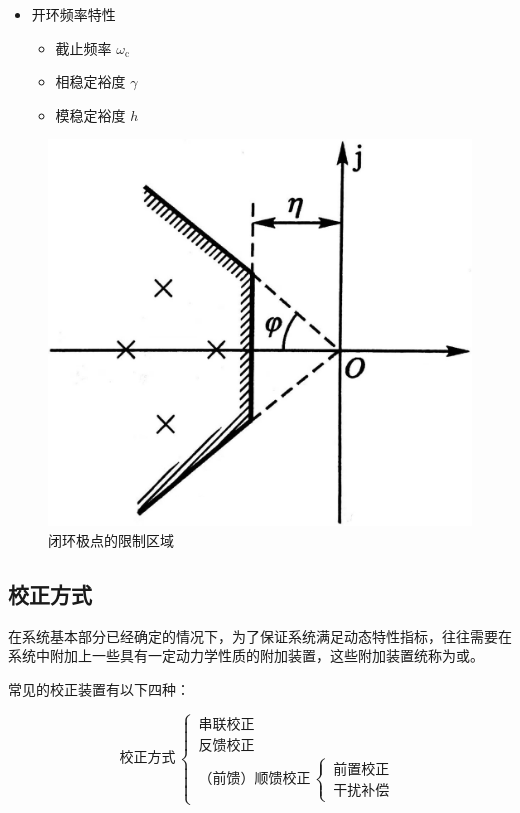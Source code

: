 \begin{enumerate}[1. ]
\begin{minipage}{0.7\linewidth}
\begin{itemize}
		\item 开环频率特性
		\begin{itemize}
			\item 截止频率 \quad $\omega_{\text{c}}$
			\item 相稳定裕度 \quad $\gamma$
			\item 模稳定裕度 \quad $h$
		\end{itemize}
	\end{itemize}
	\end{minipage}
\end{enumerate}
	
\begin{figure}[!htb]
	\centering
	\includegraphics[width=0.3\linewidth]{pic/复数域性能指标.jpeg}
	\vspace*{-1em}
	\caption{闭环极点的限制区域}
	\label{复数域性能指标}
\end{figure}

\subsection{校正方式}
	在系统基本部分已经确定的情况下，为了保证系统满足动态特性指标，往往需要在系统中附加上一些具有一定动力学性质的附加装置，这些附加装置统称为或。
	
	常见的校正装置有以下四种：
	
\begin{equation*}
	\mbox{校正方式}\,
	\begin{cases}
		\, \mbox{串联校正}\\
		\, \mbox{反馈校正}\\
		\, \mbox{（前馈）顺馈校正}\,
		\begin{cases}
			\, \mbox{前置校正}\\
			\, \mbox{干扰补偿}
		\end{cases}
	\end{cases}
\end{equation*}

